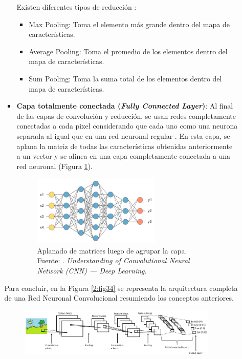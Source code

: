 \begin{itemize}
\begin{itemize}
\begin{itemize}
			Existen diferentes tipos de reducción \parencite{tec_prabhu2018cnn}:
			\begin{itemize}
				\item Max Pooling: Toma el elemento más grande dentro del mapa de características.
				\item Average Pooling: Toma el promedio de los elementos dentro del mapa de características.
				\item Sum Pooling: Toma la suma total de los elementos dentro del mapa de características.
			\end{itemize}
			
			\item \textbf{Capa totalmente conectada (\textit{Fully Connected Layer})}: Al final de las capas de convolución y reducción, se usan redes completamente conectadas a cada pixel considerando que cada uno como una neurona separada al igual que en una red neuronal regular \parencite{tec_lopez2016cnnTF}. En esta capa, se aplana la matriz de todas las características obtenidas anteriormente a un vector y se alinea en una capa completamente conectada a una red neuronal (Figura \ref{2:fig33}).
			\begin{figure}[h]
				\begin{center}
					\includegraphics[width=0.65\textwidth]{2/figures/fully_conected_cnn.jpg}
					\caption[Aplanado de matrices luego de agrupar la capa]{Aplanado de matrices luego de agrupar la capa.\\
					Fuente: \cite{tec_prabhu2018cnn}. \textit{Understanding of Convolutional Neural Network (CNN) — Deep Learning}.}
					\label{2:fig33}
				\end{center}
			\end{figure}
		\end{itemize}
		Para concluir, en la Figura \ref{2:fig34} se representa la arquitectura completa de una Red Neuronal Convolucional resumiendo los conceptos anteriores.
		\begin{figure}[h]
			\begin{center}
				\includegraphics[width=0.95\textwidth]{2/figures/arquitectura_cnn.jpg}

\end{center}
\end{figure}
\end{itemize}
\end{itemize}
